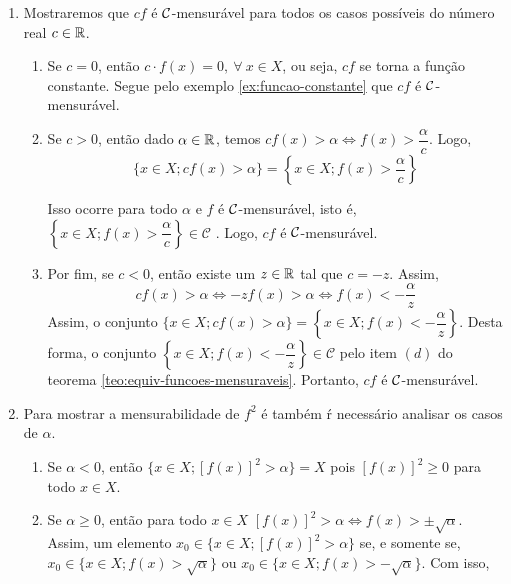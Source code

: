 \begin{prova}
    \begin{enumerate}[label*=(\alph*)]
        \item Mostraremos que $cf$ é $\operatorname{\mathcal{C}}$-mensurável para todos os casos possíveis do número real $c \in \mathbb{R}$.
            \begin{enumerate}[label=(\roman*)]
                \item Se $c = 0$, então $c\cdot f(x) = 0, \ \forall \ x \in X$, ou seja, $cf$ se torna a função constante. Segue pelo exemplo \ref{ex:funcao-constante} que $cf$ é $\operatorname{\mathcal{C}}$-mensurável.
                
                \item Se $c>0$, então  dado $\alpha \in \mathbb{R}$, temos $cf(x) > \alpha \Leftrightarrow f(x) >\dfrac{\alpha}{c}$. 
                Logo, 
                $$
                \{x \in X; cf(x) > \alpha\} 
                = 
                \left\{x \in X; f(x) > \dfrac{\alpha}{c}\right\}
                $$
                    
                Isso ocorre para todo $\alpha$ e $f$ é $\operatorname{\mathcal{C}}$-mensurável, isto é, $\left\{x \in X; f(x) > \dfrac{\alpha}{c}\right\} \in \mathcal{C}$  . Logo, $cf$ é $\operatorname{\mathcal{C}}$-mensurável.
                
                \item Por fim, se $c < 0$, então existe um $z \in \mathbb{R}$ tal que $c = -z$.
                Assim, 
                $$cf(x) >\alpha \Leftrightarrow -zf(x) >\alpha \Leftrightarrow f(x) < -\dfrac{\alpha}{z}$$
                Assim, o conjunto $\{x \in X; cf(x) > \alpha \} = \left\{x \in X; f(x) < -\dfrac{\alpha}{z}\right\}$.
                Desta forma, o conjunto  $\left\{x \in X; f(x) < -\dfrac{\alpha}{z}\right\}  \in \mathcal{C}$ pelo  item $(d)$ do teorema \ref{teo:equiv-funcoes-mensuraveis}. Portanto,  $cf$ é $\operatorname{\mathcal{C}}$-mensurável.
            \end{enumerate}
            
        \item Para mostrar a mensurabilidade de $f^2$ é também ŕ necessário analisar os casos de $\alpha$.
            \begin{enumerate}[label = (\roman*)]
                \item Se $\alpha < 0$, então $\{x \in X; [f(x)]^2 > \alpha\} = X$ pois $[f(x)]^2 \geq 0$ para todo $x \in X$.
                
                \item Se $\alpha \geq 0$, então para todo $x \in X$ $[f(x)]^2 > \alpha \Leftrightarrow f(x) > \pm \sqrt{\alpha}$.
                Assim, um elemento 
                $x_0 \in \{x \in X; [f(x)]^2 > \alpha\}$ se, e somente se, $x_0 \in \{x \in X; f(x)> \sqrt{\alpha}\}$ ou \linebreak $x_0 \in \{x \in X; f(x)> -\sqrt{\alpha}\}$.
                Com isso, 
                

\end{enumerate}
\end{enumerate}
\end{prova}
